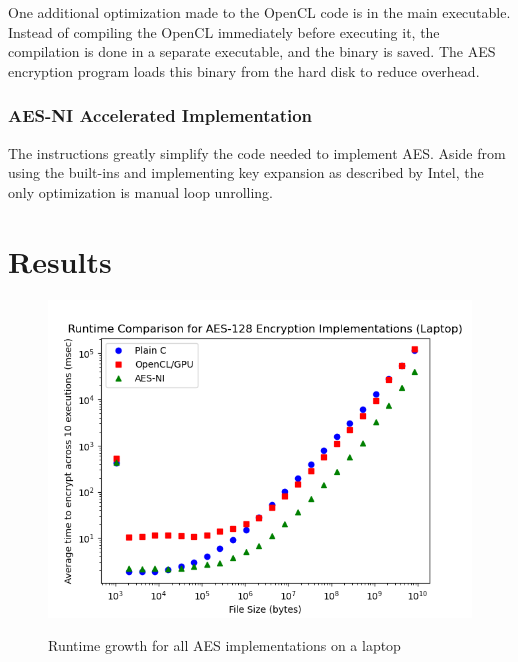 \documentclass[a4paper,10pt]{article}
\begin{document}
One additional optimization made to the OpenCL code is in the main executable.  Instead of compiling the OpenCL immediately before executing it, the compilation is done in a separate executable, and the binary is saved.  The AES encryption program loads this binary from the hard disk to reduce overhead.

\subsubsection{AES-NI Accelerated Implementation}

The instructions greatly simplify the code needed to implement AES.  Aside from using the built-ins and implementing key expansion as described by Intel, the only optimization is manual loop unrolling.

\section{Results}

\begin{figure}[H]
 \begin{center}
  \includegraphics[width=\textwidth]{results_laptop.png}
  \label{plot_laptop}
  \caption{Runtime growth for all AES implementations on a laptop}
 \end{center}
\end{figure}
\end{document}
